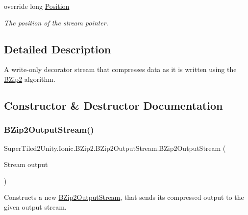 \begin{DoxyCompactItemize}
override long \mbox{\hyperlink{class_super_tiled2_unity_1_1_ionic_1_1_b_zip2_1_1_b_zip2_output_stream_ad6f2f4ac9c306cbeecdc5e2178e2a316}{Position}}
\begin{DoxyCompactList}\small\item\em The position of the stream pointer. \end{DoxyCompactList}\end{DoxyCompactItemize}


\subsection{Detailed Description}
A write-\/only decorator stream that compresses data as it is written using the \mbox{\hyperlink{namespace_super_tiled2_unity_1_1_ionic_1_1_b_zip2}{B\+Zip2}} algorithm. 



\subsection{Constructor \& Destructor Documentation}
\mbox{\label{class_super_tiled2_unity_1_1_ionic_1_1_b_zip2_1_1_b_zip2_output_stream_ae74c1b1e130afe332398798a774dbcbf}} 
\subsubsection{\texorpdfstring{B\+Zip2\+Output\+Stream()}{BZip2OutputStream()}\hspace{0.1cm}{\footnotesize\ttfamily [1/4]}}
{\footnotesize\ttfamily Super\+Tiled2\+Unity.\+Ionic.\+B\+Zip2.\+B\+Zip2\+Output\+Stream.\+B\+Zip2\+Output\+Stream (\begin{DoxyParamCaption}\item[{Stream}]{output }\end{DoxyParamCaption})}



Constructs a new {\ttfamily \mbox{\hyperlink{class_super_tiled2_unity_1_1_ionic_1_1_b_zip2_1_1_b_zip2_output_stream}{B\+Zip2\+Output\+Stream}}}, that sends its compressed output to the given output stream. 


